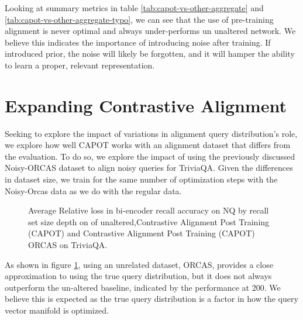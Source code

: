 Looking at summary metrics in table \ref{tab:capot-vs-other-aggregate} and \ref{tab:capot-vs-other-aggregate-typo}, we can see that the use of pre-training alignment is never optimal and always under-performs un unaltered network. We believe this indicates the importance of introducing noise after training. If introduced prior, the noise will likely be forgotten, and it will hamper the ability to learn a proper, relevant representation. \\

\section{Expanding Contrastive Alignment}
Seeking to explore the impact of variations in alignment query distribution's role, we explore how well CAPOT works with an alignment dataset that differs from the evaluation. To do so, we explore the impact of using the previously discussed Noisy-ORCAS dataset to align noisy queries for TriviaQA. Given the differences in dataset size, we train for the same number of optimization steps with the Noisy-Orcas data as we do with the regular data. \\
\begin{figure}[!htb]
    \centering
    \caption{Average Relative loss in bi-encoder recall accuracy on NQ by recall set size depth on of unaltered,Contrastive Alignment Post Training (CAPOT) and Contrastive Alignment Post Training (CAPOT) ORCAS on TriviaQA.}
    \label{fig:CAPOT-orcas}
\end{figure} 
As shown in figure \ref{fig:CAPOT-orcas}, using an unrelated dataset, ORCAS, provides a close approximation to using the true query distribution, but it does not always outperform the un-altered baseline, indicated by the performance at 200. We believe this is expected as the true query distribution is a factor in how the query vector manifold is optimized.  
